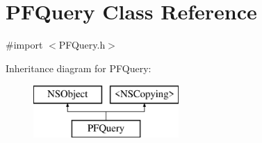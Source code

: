 \hypertarget{interface_p_f_query}{}\section{P\+F\+Query Class Reference}
\label{interface_p_f_query}


{\ttfamily \#import $<$P\+F\+Query.\+h$>$}

Inheritance diagram for P\+F\+Query\+:\begin{figure}[H]
\begin{center}
\leavevmode
\includegraphics[height=2.000000cm]{interface_p_f_query}
\end{center}
\end{figure}
